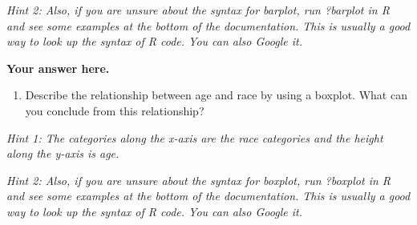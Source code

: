 \documentclass[
]{article}
\newenvironment{Shaded}{\begin{snugshade}}{\end{snugshade}}
\newcommand{\FunctionTok}[1]{\textcolor[rgb]{0.00,0.00,0.00}{#1}}
\newcommand{\NormalTok}[1]{#1}
\newcommand{\SpecialCharTok}[1]{\textcolor[rgb]{0.00,0.00,0.00}{#1}}
\providecommand{\tightlist}{%
  \setlength{\itemsep}{0pt}\setlength{\parskip}{0pt}}
\begin{document}
\emph{Hint 2: Also, if you are unsure about the syntax for barplot, run
?barplot in R and see some examples at the bottom of the documentation.
This is usually a good way to look up the syntax of R code. You can also
Google it.}

\textbf{Your answer here.}

\begin{enumerate}
\def\labelenumi{\alph{enumi}.}
\setcounter{enumi}{1}
\tightlist
\item
  Describe the relationship between age and race by using a boxplot.
  What can you conclude from this relationship?
\end{enumerate}

\emph{Hint 1: The categories along the x-axis are the race categories
and the height along the y-axis is age.}

\emph{Hint 2: Also, if you are unsure about the syntax for boxplot, run
?boxplot in R and see some examples at the bottom of the documentation.
This is usually a good way to look up the syntax of R code. You can also
Google it.}

\begin{Shaded}
\end{Shaded}
\end{document}
